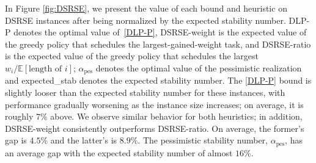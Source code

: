 \documentclass{article}
\newcommand{\E}{\mathbb{E}}
\DeclareMathOperator{\pes}{pes}
\begin{document}
In Figure \ref{fig:DSRSE}, we present the value of each bound and heuristic on DSRSE instances after being normalized by the expected stability number.
DLP-P denotes the optimal value of~\eqref{DLP-P}, DSRSE-weight is the expected value of the greedy policy that schedules the largest-gained-weight task, and DSRSE-ratio is the expected value of the greedy policy that schedules the largest $w_i/\E[\text{length of }i]$; $\alpha_\pes$ denotes the optimal value of the pessimistic realization and expected\_stab denotes the expected stability number.
The \eqref{DLP-P} bound is slightly looser than the expected stability number for these instances, with performance gradually worsening as the instance size increases; on average, it is roughly $7\%$ above. 
We observe similar behavior for both heuristics; in addition, DSRSE-weight consistently outperforms DSRSE-ratio. On average, the former's gap is $4.5\%$ and the latter's is $8.9\%$. The pessimistic stability number, $\alpha_\pes$, has an average gap with the expected stability number of almost $16\%$.
\end{document}
